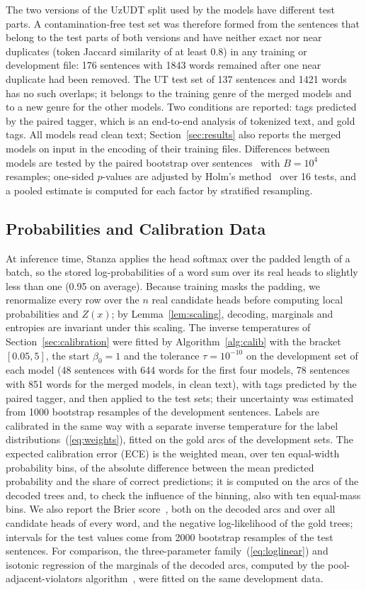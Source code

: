 \documentclass[mathematics,article,submit,pdftex,oneauthor]{Definitions/mdpi}
\begin{document}
The two versions of the UzUDT split used by the models have different test parts.
A contamination-free test set was therefore formed from the sentences that belong to the test parts of both versions and have neither exact nor near duplicates (token Jaccard similarity of at least 0.8) in any training or development file: 176 sentences with 1843 words remained after one near duplicate had been removed.
The UT test set of 137 sentences and 1421 words has no such overlaps; it belongs to the training genre of the merged models and to a new genre for the other models.
Two conditions are reported: tags predicted by the paired tagger, which is an end-to-end analysis of tokenized text, and gold tags.
All models read clean text; Section~\ref{sec:results} also reports the merged models on input in the encoding of their training files.
Differences between models are tested by the paired bootstrap over sentences~\cite{BergKirkpatrick2012} with $B=10^4$ resamples; one-sided $p$-values are adjusted by Holm's method~\cite{Holm1979} over 16 tests, and a pooled estimate is computed for each factor by stratified resampling.

\subsection{Probabilities and Calibration Data}\label{sec:calibdata}
At inference time, Stanza applies the head softmax over the padded length of a batch, so the stored log-probabilities of a word sum over its real heads to slightly less than one (0.95 on average).
Because training masks the padding, we renormalize every row over the $n$ real candidate heads before computing local probabilities and $Z(x)$; by Lemma~\ref{lem:scaling}, decoding, marginals and entropies are invariant under this scaling.
The inverse temperatures of Section~\ref{sec:calibration} were fitted by Algorithm~\ref{alg:calib} with the bracket $[0.05,5]$, the start $\beta_0=1$ and the tolerance $\tau=10^{-10}$ on the development set of each model (48 sentences with 644 words for the first four models, 78 sentences with 851 words for the merged models, in clean text), with tags predicted by the paired tagger, and then applied to the test sets; their uncertainty was estimated from 1000 bootstrap resamples of the development sentences.
Labels are calibrated in the same way with a separate inverse temperature for the label distributions~(\ref{eq:weights}), fitted on the gold arcs of the development sets.
The expected calibration error (ECE) is the weighted mean, over ten equal-width probability bins, of the absolute difference between the mean predicted probability and the share of correct predictions; it is computed on the arcs of the decoded trees and, to check the influence of the binning, also with ten equal-mass bins.
We also report the Brier score~\cite{Brier1950}, both on the decoded arcs and over all candidate heads of every word, and the negative log-likelihood of the gold trees; intervals for the test values come from 2000 bootstrap resamples of the test sentences.
For comparison, the three-parameter family~(\ref{eq:loglinear}) and isotonic regression of the marginals of the decoded arcs, computed by the pool-adjacent-violators algorithm~\cite{Zadrozny2002}, were fitted on the same development data.
\end{document}
